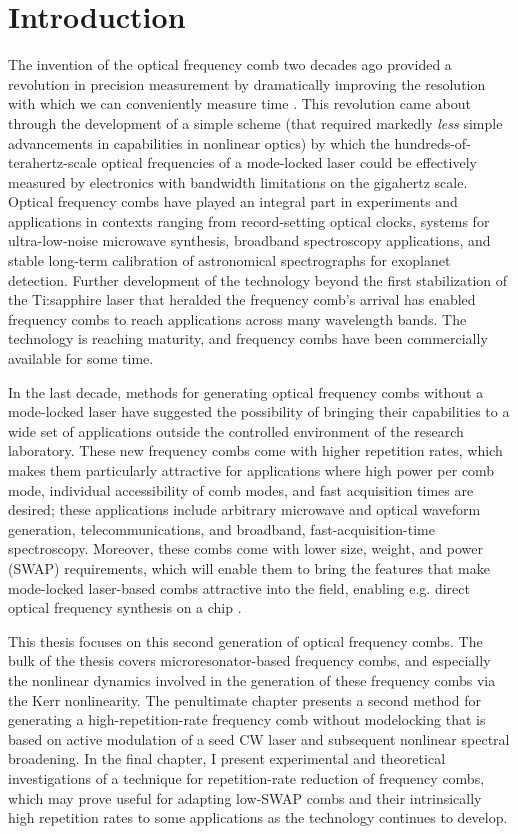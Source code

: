  \chapter{Introduction}
\label{ch:intro}

The invention of the optical frequency comb two decades ago provided a revolution in precision measurement by dramatically improving the resolution with which we can conveniently measure time \cite{Diddams2000,Jones2000,Udem2002,Hall2006,Hansch2006}. This revolution came about through the development of a simple scheme (that required markedly \textit{less} simple advancements in capabilities in nonlinear optics\cite{Ranka2000}) by which the hundreds-of-terahertz-scale optical frequencies of a mode-locked laser could be effectively measured by electronics with bandwidth limitations on the gigahertz scale. Optical frequency combs have played an integral part in experiments and applications in contexts ranging from record-setting optical clocks, systems for ultra-low-noise microwave synthesis, broadband spectroscopy applications, and stable long-term calibration of astronomical spectrographs for exoplanet detection\cite{Steinmetz2008}. Further development of the technology beyond the first stabilization of the Ti:sapphire laser that heralded the frequency comb's arrival has enabled frequency combs to reach applications across many wavelength bands. The technology is reaching maturity, and frequency combs have been commercially available for some time.

In the last decade, methods for generating optical frequency combs without a mode-locked laser have suggested the possibility of bringing their capabilities to a wide set of applications outside the controlled environment of the research laboratory. These new frequency combs come with higher repetition rates, which makes them particularly attractive for applications where high power per comb mode, individual accessibility of comb modes, and fast acquisition times are desired; these applications include arbitrary microwave and optical waveform generation, telecommunications, and broadband, fast-acquisition-time spectroscopy. Moreover, these combs come with lower size, weight, and power (SWAP) requirements, which will enable them to bring the features that make mode-locked laser-based combs attractive into the field, enabling e.g. direct optical frequency synthesis on a chip \cite{Spencer2018}.

This thesis focuses on this second generation of optical frequency combs. The bulk of the thesis covers microresonator-based frequency combs, and especially the nonlinear dynamics involved in the generation of these frequency combs via the Kerr nonlinearity. The penultimate chapter presents a second method for generating a high-repetition-rate frequency comb without modelocking that is based on active modulation of a seed CW laser and subsequent nonlinear spectral broadening. In the final chapter, I present experimental and theoretical investigations of a technique for repetition-rate reduction of frequency combs, which may prove useful for adapting low-SWAP combs and their intrinsically high repetition rates to some applications as the technology continues to develop.

